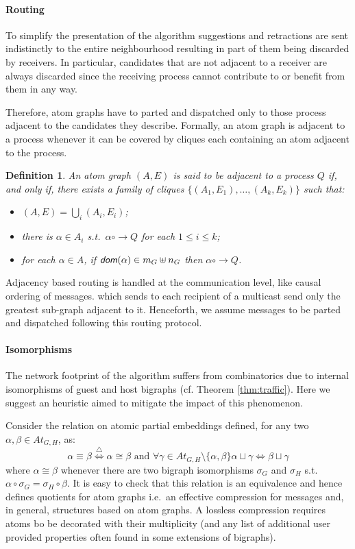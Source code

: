 \documentclass[a4paper,english,10pt]{article}
\theoremstyle{plain}\newtheorem{theorem}{Theorem}
\theoremstyle{plain}\newtheorem{corollary}[theorem]{Corollary}
\theoremstyle{plain}\newtheorem{proposition}[theorem]{Proposition}
\theoremstyle{plain}\newtheorem{lemma}[theorem]{Lemma}
\theoremstyle{plain}\newtheorem{definition}{Definition}
\theoremstyle{plain}\newtheorem{remark}{Remark}
\theoremstyle{plain}\newtheorem{example}[remark]{Example}
\newcommand{\?}[1]{}
\newcommand{\defiff}{\stackrel{\triangle}{\iff}}
\newcommand{\dom}{\textsf{\textit{dom}}}
\newcommand{\adjto}{\mathrel{{\circ}\!{\to}}}
\begin{document}
\paragraph{Routing}
To simplify the presentation of the algorithm suggestions and retractions
are sent indistinctly to the entire neighbourhood resulting in
part of them being discarded by receivers.
In particular, candidates that are not adjacent to a receiver
are always discarded since the receiving process cannot
contribute to or benefit from them in any way.

Therefore, atom graphs have to parted and dispatched only
to those process adjacent to the candidates they describe.
Formally, an atom graph is adjacent to a process whenever
it can be covered by cliques each containing an atom adjacent
to the process.
\begin{definition}
	\label{def:adj-routing}
	An atom graph $(A,E)$ is said to be \emph{adjacent} to a process $Q$
	if, and only if, there exists a family of cliques $\{(A_1,E_1),\dots,(A_k,E_k)\}$	such that:
	\begin{itemize}\itemsep=0pt
		\item 
			$(A,E) = \bigcup_{i} (A_i,E_i)$;
		\item
			there is $\alpha \in A_i$ s.t.~$\alpha \adjto Q$
			for each $1 \leq i \leq k$;
		\item
			for each $\alpha \in A$,
			if $\dom(\alpha) \in m_G \uplus n_G$ then
			$\alpha \adjto Q$.
	\end{itemize}
\end{definition}
Adjacency based routing is handled at the communication level,
like causal ordering of messages. which sends to each recipient
of a multicast send only the greatest sub-graph adjacent to it.
Henceforth, we assume messages to be parted and dispatched
following this routing protocol.

\paragraph{Isomorphisms}
The network footprint of the algorithm suffers from combinatorics
due to internal isomorphisms of guest and host bigraphs
(cf. Theorem \ref{thm:traffic}). Here we suggest an heuristic
aimed to mitigate the impact of this phenomenon.

Consider the relation on atomic partial embeddings defined,
for any two $\alpha,\beta \in At_{G,H}$, as:
\[
	\alpha \equiv \beta 
	\defiff 
	\alpha \cong \beta 
	\text{ and }
	\forall \gamma \in At_{G,H}\setminus\{\alpha,\beta\}
	\alpha \sqcup \gamma \iff \beta \sqcup \gamma
\]
where $\alpha\cong \beta$ whenever there are two
bigraph isomorphisms $\sigma_G$ and $\sigma_H$ s.t.~$
	\alpha \circ \sigma_G = \sigma_H \circ \beta
	$.
It is easy to check that this relation is an equivalence
and hence defines quotients for atom graphs i.e.~an effective
compression for messages and, in general, structures based
on atom graphs.
A lossless compression requires atoms bo be decorated with their
multiplicity (and any list of additional user provided
properties often found in some extensions of bigraphs).
\end{document}
